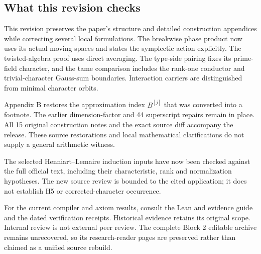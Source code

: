 \subsection*{What this revision checks}
This revision preserves the paper's structure and detailed construction appendices while correcting several local formulations. The breakwise phase product now uses its actual moving spaces and states the symplectic action explicitly. The twisted-algebra proof uses direct averaging. The type-side pairing fixes its prime-field character, and the tame comparison includes the rank-one conductor and trivial-character Gauss-sum boundaries. Interaction carriers are distinguished from minimal character orbits.

Appendix B restores the approximation index \(B^{[j]}\) that was converted into a footnote. The earlier dimension-factor and 44 superscript repairs remain in place. All 15 original construction notes and the exact source diff accompany the release. These source restorations and local mathematical clarifications do not supply a general arithmetic witness.

The selected Henniart--Lemaire induction inputs \cite{HenniartLemaire2011} have now been checked against the full official text, including their characteristic, rank and normalization hypotheses. The new source review is bounded to the cited application; it does not establish H5 or corrected-character occurrence.

For the current compiler and axiom results, consult the Lean and evidence guide and the dated verification receipts. Historical evidence retains its original scope. Internal review is not external peer review. The complete Block 2 editable archive remains unrecovered, so its research-reader pages are preserved rather than claimed as a unified source rebuild.

\endgroup
